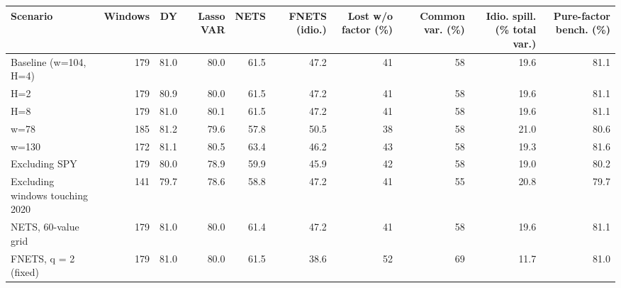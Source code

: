 \begin{tabular}{lrrrrrrrrr}
\toprule
Scenario & Windows & DY & Lasso VAR & NETS & FNETS (idio.) & Lost w/o factor (\%) & Common var. (\%) & Idio. spill. (\% total var.) & Pure-factor bench. (\%) \\
\midrule
Baseline (w=104, H=4) & 179 & 81.0 & 80.0 & 61.5 & 47.2 & 41 & 58 & 19.6 & 81.1 \\
H=2 & 179 & 80.9 & 80.0 & 61.5 & 47.2 & 41 & 58 & 19.6 & 81.1 \\
H=8 & 179 & 81.0 & 80.1 & 61.5 & 47.2 & 41 & 58 & 19.6 & 81.1 \\
w=78 & 185 & 81.2 & 79.6 & 57.8 & 50.5 & 38 & 58 & 21.0 & 80.6 \\
w=130 & 172 & 81.1 & 80.5 & 63.4 & 46.2 & 43 & 58 & 19.3 & 81.6 \\
Excluding SPY & 179 & 80.0 & 78.9 & 59.9 & 45.9 & 42 & 58 & 19.0 & 80.2 \\
Excluding windows touching 2020 & 141 & 79.7 & 78.6 & 58.8 & 47.2 & 41 & 55 & 20.8 & 79.7 \\
NETS, 60-value grid & 179 & 81.0 & 80.0 & 61.4 & 47.2 & 41 & 58 & 19.6 & 81.1 \\
FNETS, q = 2 (fixed) & 179 & 81.0 & 80.0 & 61.5 & 38.6 & 52 & 69 & 11.7 & 81.0 \\
\bottomrule
\end{tabular}

